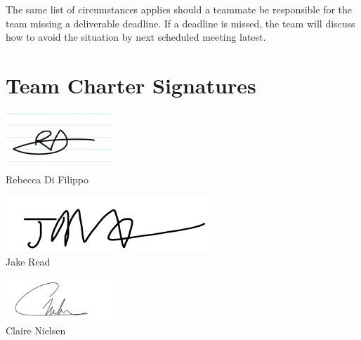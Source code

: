 \documentclass{article}
\begin{document}
The same list of circumstances applies should a teammate be responsible for the team missing a deliverable deadline. If a deadline is missed, the team will discuss how to avoid the situation by next scheduled meeting latest. \\

\newpage

\section{Team Charter Signatures}

\includegraphics[width=0.3\textwidth]{signature_becca}\\
Rebecca Di Filippo \\ 
\date{\today}

\includegraphics{signature_jake}\\
Jake Read\\
\date{\today}

\includegraphics[width=0.3\textwidth]{signature_claire}\\
Claire Nielsen\\
\date{\today}
\end{document}
